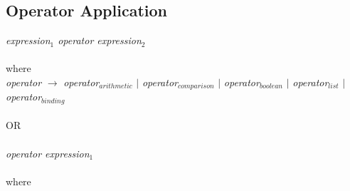 \subsection{Operator Application}
    \emph{expression$_{1}$  operator  expression$_{2}$}\\ \\
    where\\
    
    \emph{operator} $\rightarrow$ 
        \emph{operator$_{arithmetic}$} $|$
        \emph{operator$_{comparison}$}  $|$ 
        \emph{operator$_{boolean}$}  $|$
        \emph{operator$_{list}$}  $|$
        \emph{operator$_{binding}$} \\ \\
OR\\ \\
          \emph{operator  expression$_{1}$}\\ \\
    where\\
    
